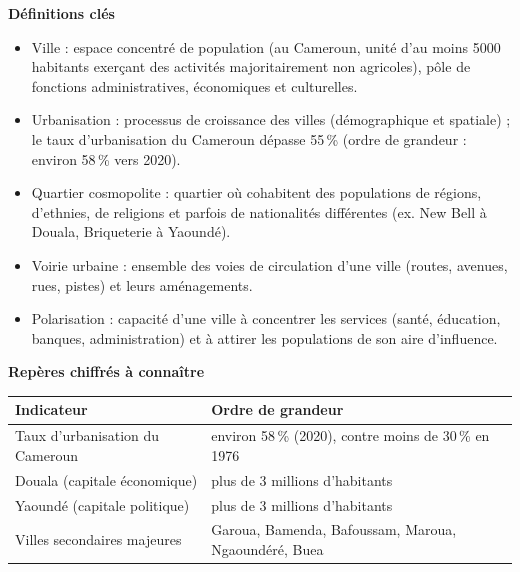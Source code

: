 \documentclass[11pt]{article}
\newcommand{\cle}[1]{{\popxbold\color{popdark}#1}}
\begin{document}
\begin{bilan}
\textbf{Définitions clés}
\begin{itemize}
  \item \cle{Ville} : espace concentré de population (au Cameroun, unité d'au moins \num{5000} habitants exerçant des activités majoritairement non agricoles), pôle de fonctions administratives, économiques et culturelles.
  \item \cle{Urbanisation} : processus de croissance des villes (démographique et spatiale) ; le taux d'urbanisation du Cameroun dépasse 55\,\% (ordre de grandeur : environ 58\,\% vers 2020).
  \item \cle{Quartier cosmopolite} : quartier où cohabitent des populations de régions, d'ethnies, de religions et parfois de nationalités différentes (ex. New Bell à Douala, Briqueterie à Yaoundé).
  \item \cle{Voirie urbaine} : ensemble des voies de circulation d'une ville (routes, avenues, rues, pistes) et leurs aménagements.
  \item \cle{Polarisation} : capacité d'une ville à concentrer les services (santé, éducation, banques, administration) et à attirer les populations de son aire d'influence.
\end{itemize}

\textbf{Repères chiffrés à connaître}
\begin{center}
\begin{tabularx}{\linewidth}{|l|X|}\hline
\rowcolor{popblueL} \textbf{Indicateur} & \textbf{Ordre de grandeur} \\ \hline
Taux d'urbanisation du Cameroun & environ 58\,\% (2020), contre moins de 30\,\% en 1976 \\ \hline
Douala (capitale économique) & plus de 3 millions d'habitants \\ \hline
Yaoundé (capitale politique) & plus de 3 millions d'habitants \\ \hline
Villes secondaires majeures & Garoua, Bamenda, Bafoussam, Maroua, Ngaoundéré, Buea \\ \hline
\end{tabularx}
\end{center}


\end{bilan}
\end{document}
